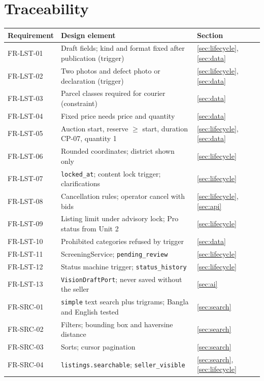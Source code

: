 \documentclass[11pt,a4paper]{article}
\begin{document}
\section{Traceability}
\label{app:trace}
{\small\begin{longtable}{@{}>{\ttfamily}p{2.4cm}>{\raggedright\arraybackslash}p{10.6cm}>{\raggedright\arraybackslash}p{2.2cm}@{}}
\toprule \textnormal{\textbf{Requirement}} & \textbf{Design element} & \textbf{Section} \\ \midrule \endhead
FR-LST-01 & Draft fields; kind and format fixed after publication (trigger) & \ref{sec:lifecycle}, \ref{sec:data} \\
FR-LST-02 & Two photos and defect photo or declaration (trigger) & \ref{sec:lifecycle}, \ref{sec:data} \\
FR-LST-03 & Parcel classes required for courier (constraint) & \ref{sec:data} \\
FR-LST-04 & Fixed price needs price and quantity & \ref{sec:data} \\
FR-LST-05 & Auction start, reserve $\ge$ start, duration CP-07, quantity 1 & \ref{sec:lifecycle}, \ref{sec:data} \\
FR-LST-06 & Rounded coordinates; district shown only & \ref{sec:lifecycle} \\
FR-LST-07 & \texttt{locked\_at}; content lock trigger; clarifications & \ref{sec:lifecycle} \\
FR-LST-08 & Cancellation rules; operator cancel with bids & \ref{sec:lifecycle}, \ref{sec:api} \\
FR-LST-09 & Listing limit under advisory lock; Pro status from Unit 2 & \ref{sec:lifecycle} \\
FR-LST-10 & Prohibited categories refused by trigger & \ref{sec:data} \\
FR-LST-11 & ScreeningService; \texttt{pending\_review} & \ref{sec:lifecycle} \\
FR-LST-12 & Status machine trigger; \texttt{status\_history} & \ref{sec:lifecycle} \\
FR-LST-13 & \texttt{VisionDraftPort}; never saved without the seller & \ref{sec:ai} \\
FR-SRC-01 & \texttt{simple} text search plus trigrams; Bangla and English tested & \ref{sec:search} \\
FR-SRC-02 & Filters; bounding box and haversine distance & \ref{sec:search} \\
FR-SRC-03 & Sorts; cursor pagination & \ref{sec:search} \\
FR-SRC-04 & \texttt{listings.searchable}; \texttt{seller\_visible} & \ref{sec:search}, \ref{sec:lifecycle} \\

\end{longtable}}
\end{document}
